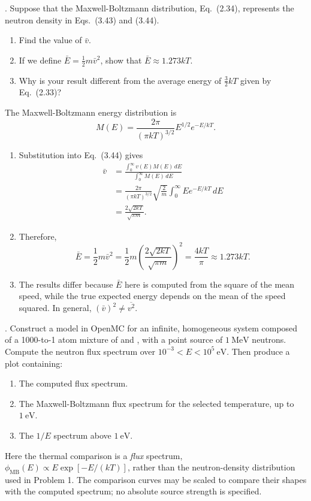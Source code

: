 
. Suppose that the Maxwell-Boltzmann
distribution, Eq.~(2.34), represents the neutron density in Eqs.~(3.43) and
(3.44).
\begin{enumerate}[label=(\alph*)]
\item Find the value of $\bar{v}$.
\item If we define $\bar{E}=\frac{1}{2}m\bar{v}^2$, show that
      $\bar{E}\approx1.273kT$.
\item Why is your result different from the average energy of
      $\frac{3}{2}kT$ given by Eq.~(2.33)?
\end{enumerate}

\begin{adaptedsolution}
The Maxwell-Boltzmann energy distribution is
\[
 M(E)=\frac{2\pi}{(\pi kT)^{3/2}}E^{1/2}e^{-E/kT}.
\]
\begin{enumerate}[label=(\alph*)]
\item Substitution into Eq.~(3.44) gives
\begin{align*}
 \bar{v}
 &=\frac{\int_0^\infty v(E)M(E)\,dE}{\int_0^\infty M(E)\,dE}\\
 &=\frac{2\pi}{(\pi kT)^{3/2}}\sqrt{\frac{2}{m}}
   \int_0^\infty E e^{-E/kT}\,dE\\
 &=\boxed{\frac{2\sqrt{2kT}}{\sqrt{\pi m}}}.
\end{align*}
\item Therefore,
\[
 \bar{E}=\frac{1}{2}m\bar{v}^2
 =\frac{1}{2}m\left(\frac{2\sqrt{2kT}}{\sqrt{\pi m}}\right)^2
 =\boxed{\frac{4kT}{\pi}\approx1.273kT}.
\]
\item The results differ because $\bar{E}$ here is computed from the square of
the mean speed, while the true expected energy depends on the mean of the
speed squared.  In general, $\left(\bar{v}\right)^2\ne\overline{v^2}$.
\end{enumerate}
\end{adaptedsolution}

\newpage

. Construct a model in OpenMC for an infinite,
homogeneous system composed of a 1000-to-1 atom mixture of  and
, with a point source of $1~\mathrm{MeV}$ neutrons. Compute the
neutron flux spectrum over $10^{-3}<E<10^5~\mathrm{eV}$. Then produce a plot
containing:
\begin{enumerate}[label=(\alph*)]
\item The computed flux spectrum.
\item The Maxwell-Boltzmann flux spectrum for the selected temperature, up to
      $1~\mathrm{eV}$.
\item The $1/E$ spectrum above $1~\mathrm{eV}$.
\end{enumerate}
Here the thermal comparison is a \emph{flux} spectrum,
$\phi_{\mathrm{MB}}(E)\propto E\exp[-E/(kT)]$, rather than the neutron-density
distribution used in Problem 1. The comparison curves may be scaled to compare
their shapes with the computed spectrum; no absolute source strength is
specified.

